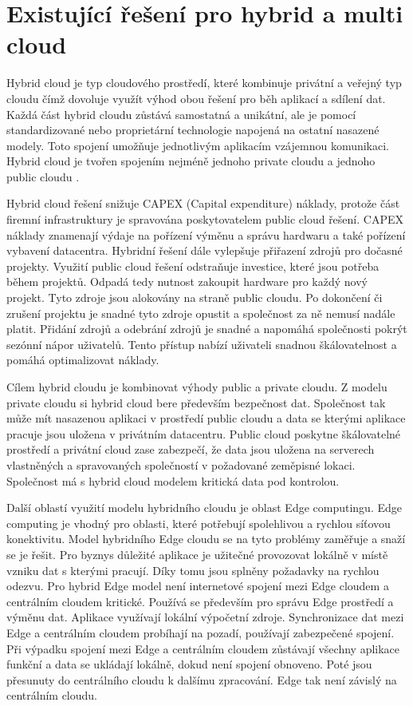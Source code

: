 \chapter{Existující řešení pro hybrid a multi cloud}
Hybrid cloud je typ cloudového prostředí, které kombinuje privátní a veřejný typ \linebreak cloudu čímž dovoluje využít výhod obou řešení pro běh aplikací a sdílení dat. Každá část hybrid cloudu zůstává samostatná a unikátní, ale je pomocí standardizované nebo proprietární technologie napojená na ostatní nasazené modely. Toto spojení umožňuje jednotlivým aplikacím vzájemnou komunikaci. Hybrid cloud je tvořen spojením nejméně jednoho private cloudu a jednoho public cloudu \cite{goyal2014public}. \par
    Hybrid cloud řešení snižuje CAPEX (Capital expenditure) náklady, protože část \linebreak firemní infrastruktury je spravována poskytovatelem public cloud řešení. CAPEX náklady znamenají výdaje na pořízení výměnu a správu hardwaru a také pořízení vybavení datacentra. Hybridní řešení dále vylepšuje přiřazení zdrojů pro dočasné projekty. Využití public cloud řešení odstraňuje investice, které jsou potřeba během projektů. Odpadá tedy nutnost zakoupit hardware pro každý nový projekt. Tyto zdroje jsou alokovány na straně public cloudu. Po dokončení či zrušení projektu je snadné tyto zdroje opustit a společnost za ně nemusí nadále platit. Přidání zdrojů a odebrání zdrojů je snadné a napomáhá společnosti pokrýt sezónní nápor uživatelů. Tento přístup nabízí uživateli snadnou škálovatelnost a pomáhá optimalizovat náklady. \par
        Cílem hybrid cloudu je kombinovat výhody public a private cloudu. Z modelu private cloudu si hybrid cloud bere především bezpečnost dat. Společnost tak může mít nasazenou aplikaci v prostředí public cloudu a data se kterými aplikace pracuje jsou uložena v privátním datacentru. Public cloud poskytne škálovatelné prostředí a privátní cloud zase zabezpečí, že data jsou uložena na serverech vlastněných a spravovaných společností v požadované zeměpisné lokaci. Společnost má s hybrid cloud modelem kritická data pod kontrolou. \par
	Další oblastí využití modelu hybridního cloudu je oblast Edge computingu. Edge computing je vhodný pro oblasti, které potřebují spolehlivou a rychlou síťovou konektivitu. Model hybridního Edge cloudu se na tyto problémy zaměřuje a snaží se je řešit. Pro byznys důležité aplikace je užitečné provozovat lokálně v místě vzniku dat s kterými pracují. Díky tomu jsou splněny požadavky na rychlou odezvu. Pro hybrid Edge model není internetové spojení mezi Edge cloudem a centrálním cloudem kritické. Používá se především pro správu Edge prostředí a výměnu dat. Aplikace využívají lokální výpočetní zdroje. Synchronizace dat mezi Edge a centrálním cloudem probíhají na pozadí, používají zabezpečené spojení. Při výpadku spojení mezi Edge a centrálním cloudem zůstávají všechny aplikace funkční a data se ukládají lokálně, dokud není spojení obnoveno. Poté jsou přesunuty do centrálního cloudu k dalšímu zpracování. Edge tak není závislý na centrálním cloudu.\par
